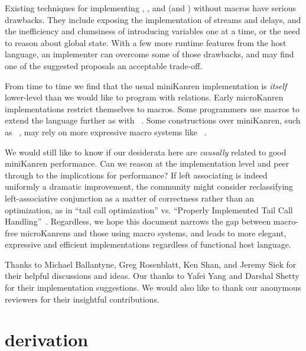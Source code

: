 \documentclass[sigplan,balance=true,pbalance=true,natbib=false]{acmart}
\begin{document}
Existing techniques for
implementing , ,
and  (and ) without macros have
serious drawbacks. They include exposing the implementation of
streams and delays, and the inefficiency and clumsiness of introducing
variables one at a time, or the need to reason about global state. With
a few more runtime features from the host language, an implementer can
overcome some of those drawbacks, and may find one of the suggested
proposals an acceptable trade-off.

From time to time we find that the usual miniKanren implementation is
\emph{itself} lower-level than we would like to program with
relations. Early microKanren implementations restrict themselves
to  macros. Some programmers use macros to
extend the language further as
with ~\cite{keep2009pattern}. Some constructions
over miniKanren, such
as ~\cite{ballantyne2020macros}, may rely on
more expressive macro systems
like ~\cite{culpepper2012fortifying}.

We would still like to know if our desiderata here are \emph{causally}
related to good miniKanren performance. Can we reason at the
implementation level and peer through to the implications for
performance? If left associating  is indeed uniformly
a dramatic improvement, the community might consider reclassifying
left-associative conjunction as a matter of correctness rather than an
optimization, as in \enquote{tail call optimization} vs.
\enquote{Properly Implemented Tail Call
  Handling}~\cite{felleisen2014requestions}. Regardless, we hope this
document narrows the gap between macro-free microKanrens and those
using macro systems, and leads to more elegant, expressive and
efficient implementations regardless of functional host language.

\begin{acks}

  Thanks to Michael Ballantyne, Greg Rosenblatt, Ken Shan, and Jeremy
  Siek for their helpful discussions and ideas. Our thanks to Yafei
  Yang and Darshal Shetty for their implementation suggestions. We
  would also like to thank our anonymous reviewers for their
  insightful contributions.

\end{acks}

\printbibliography{}

\appendix

\section{ derivation}\label{sec:conda-derivation}
\end{document}
